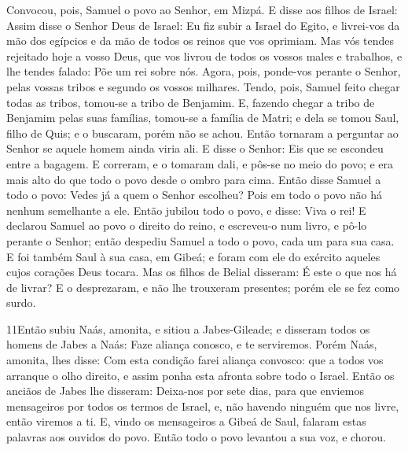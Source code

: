 Convocou, pois, Samuel o povo ao Senhor, em Mizpá. E disse
aos filhos de Israel: Assim disse o Senhor Deus de Israel: Eu fiz
subir a Israel do Egito, e livrei-vos da mão dos egípcios e da mão
de todos os reinos que vos oprimiam. Mas vós tendes rejeitado
hoje a vosso Deus, que vos livrou de todos os vossos males e
trabalhos, e lhe tendes falado: Põe um rei sobre nós. Agora, pois,
ponde-vos perante o Senhor, pelas vossas tribos e segundo os vossos
milhares. Tendo, pois, Samuel feito chegar todas as tribos,
tomou-se a tribo de Benjamim. E, fazendo chegar a tribo de
Benjamim pelas suas famílias, tomou-se a família de Matri; e dela se
tomou Saul, filho de Quis; e o buscaram, porém não se achou.
Então tornaram a perguntar ao Senhor se aquele homem ainda
viria ali. E disse o Senhor: Eis que se escondeu entre a bagagem.
E correram, e o tomaram dali, e pôs-se no meio do povo; e era
mais alto do que todo o povo desde o ombro para cima. Então
disse Samuel a todo o povo: Vedes já a quem o Senhor escolheu? Pois
em todo o povo não há nenhum semelhante a ele. Então jubilou todo o
povo, e disse: Viva o rei! E declarou Samuel ao povo o
direito do reino, e escreveu-o num livro, e pô-lo perante o Senhor;
então despediu Samuel a todo o povo, cada um para sua casa. E
foi também Saul à sua casa, em Gibeá; e foram com ele do exército
aqueles cujos corações Deus tocara. Mas os filhos de Belial
disseram: É este o que nos há de livrar? E o desprezaram, e não lhe
trouxeram presentes; porém ele se fez como surdo.

\medskip

\lettrine{11} Então subiu Naás, amonita, e sitiou a
Jabes-Gileade; e disseram todos os homens de Jabes a Naás: Faze
aliança conosco, e te serviremos. Porém Naás, amonita, lhes
disse: Com esta condição farei aliança convosco: que a todos vos
arranque o olho direito, e assim ponha esta afronta sobre todo o
Israel. Então os anciãos de Jabes lhe disseram: Deixa-nos por
sete dias, para que enviemos mensageiros por todos os termos de
Israel, e, não havendo ninguém que nos livre, então viremos a ti.
E, vindo os mensageiros a Gibeá de Saul, falaram estas palavras
aos ouvidos do povo. Então todo o povo levantou a sua voz, e chorou.

